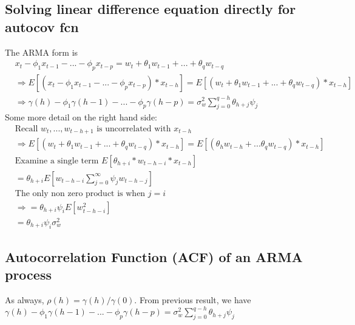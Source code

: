 \subsection{Solving linear difference equation directly for autocov fcn}
The ARMA form is 
    \begin{align*}
        & x_t - \phi_1 x_{t-1} - ... - \phi_p x_{t-p} = w_t + \theta_1w_{t-1} + ... + \theta_q w_{t-q}\\
        & \Longrightarrow E[(x_t - \phi_1 x_{t-1} - ... - \phi_p x_{t-p}) * x_{t-h}] = E[(w_t + \theta_1w_{t-1} + ... + \theta_q w_{t-q}) * x_{t-h}]\\
        & \Longrightarrow \gamma(h) - \phi_1 \gamma(h-1) - ... - \phi_p \gamma(h-p) = \sigma_w^2 \sum_{j=0}^{q-h} \theta_{h+j}\psi_j
    \end{align*}
Some more detail on the right hand side: 
    \begin{align*}
        & \textrm{Recall } w_t, ..., w_{t-h+1} \textrm{ is uncorrelated with } x_{t-h} \\
        & \Longrightarrow E[(w_t + \theta_1w_{t-1} + ... + \theta_q w_{t-q}) * x_{t-h}] = E[(\theta_h w_{t-h} + ... \theta_q w_{t-q}) * x_{t-h}]\\
        & \textrm{Examine a single term $E[\theta_{h+i} * w_{t-h-i} * x_{t-h}]$} \\
        & = \theta_{h+i}E[w_{t-h-i} \sum_{j=0}^\infty \psi_j w_{t-h-j}] \\
        & \textrm{The only non zero product is when $j = i$} \\
        & \Longrightarrow = \theta_{h+i}\psi_i E[w_{t-h-i}^2] \\
        & = \theta_{h+i} \psi_i \sigma_w^2
    \end{align*}
    
\subsection{Autocorrelation Function (ACF) of an ARMA process} 
As always, $\rho(h) = \gamma(h)/\gamma(0)$. From previous result, we have $\gamma(h) - \phi_1 \gamma(h-1) - ... - \phi_p \gamma(h-p) = \sigma_w^2 \sum_{j=0}^{q-h} \theta_{h+j}\psi_j$

